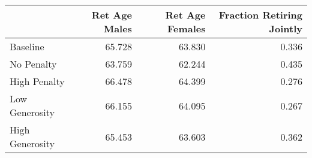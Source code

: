 \begin{tabular}{lrrr}
\toprule
{} & Ret Age Males & Ret Age Females & Fraction Retiring Jointly \\
\midrule
Baseline        &        65.728 &          63.830 &                     0.336 \\
No Penalty      &        63.759 &          62.244 &                     0.435 \\
High Penalty    &        66.478 &          64.399 &                     0.276 \\
Low Generosity  &        66.155 &          64.095 &                     0.267 \\
High Generosity &        65.453 &          63.603 &                     0.362 \\
\bottomrule
\end{tabular}
